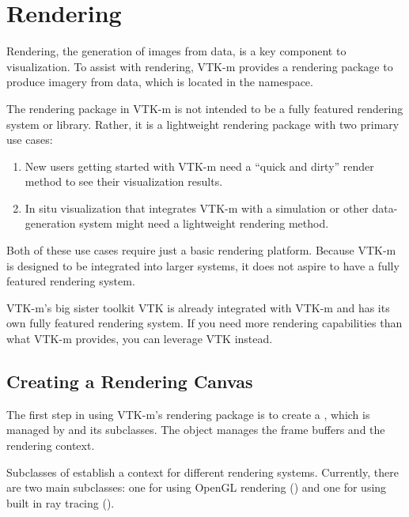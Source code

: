 
\chapter{Rendering}
\label{chap:Rendering}


Rendering, the generation of images from data, is a key component to visualization.
To assist with rendering, VTK-m provides a rendering package to produce imagery from data, which is located in the \vtkmrendering{} namespace.

The rendering package in VTK-m is not intended to be a fully featured
rendering system or library. Rather, it is a lightweight rendering package
with two primary use cases:
\begin{enumerate}
\item New users getting started with VTK-m need a ``quick and dirty''
  render method to see their visualization results.
\item In situ visualization that integrates VTK-m with a simulation or
  other data-generation system might need a lightweight rendering method.
\end{enumerate}

Both of these use cases require just a basic rendering platform. Because
VTK-m is designed to be integrated into larger systems, it does not aspire
to have a fully featured rendering system.

\begin{didyouknow}
  VTK-m's big sister toolkit VTK is already integrated with VTK-m and has
  its own fully featured rendering system. If you need more rendering
  capabilities than what VTK-m provides, you can leverage VTK instead.
\end{didyouknow}

\section{Creating a Rendering Canvas}
\label{sec:Canvas}


The first step in using VTK-m's rendering package is to create a
, which is managed by  and its
subclasses. The  object manages the frame buffers
and the rendering context.

Subclasses of  establish a context for different
rendering systems. Currently, there are two main subclasses: one for using
OpenGL rendering () and one for using built in
ray tracing ().


